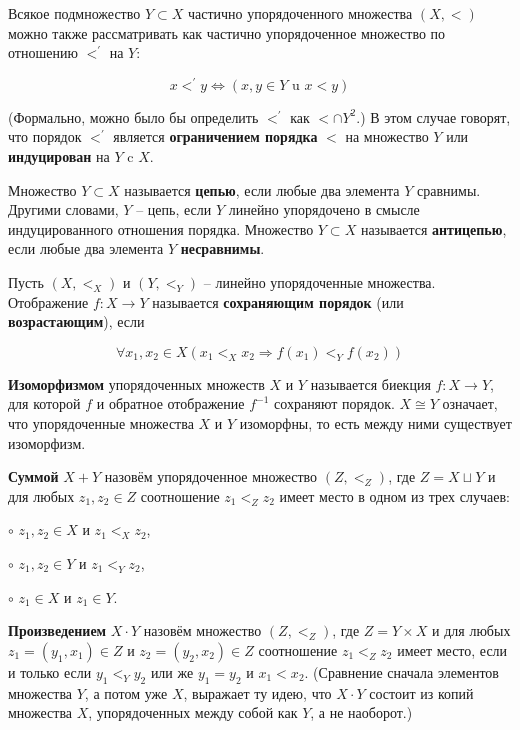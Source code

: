\begin{definition}
	Всякое подмножество $Y \subset X$ частично упорядоченного множества $(X, <)$ можно также рассматривать как
	частично упорядоченное множество по отношению $<^\prime$ на $Y$:

	$$
	x<^{\prime} y \Longleftrightarrow(x, y \in Y \text { u } x<y)
	$$

	(Формально, можно было бы определить $<^\prime$ как $< \cap Y^2$.) В этом случае говорят, что порядок
	$<^\prime$ является \textbf{ограничением порядка} $<$ на множество $Y$ или \textbf{индуцирован} на $Y$ c $X$.

	Множество $Y \subset X$ называется \textbf{цепью}, если любые два элемента $Y$ сравнимы. Другими словами, $Y$
	-- цепь, если $Y$ линейно упорядочено в смысле индуцированного отношения порядка. Множество $Y \subset X$
	называется \textbf{антицепью}, если любые два элемента $Y$ \textbf{несравнимы}.
\end{definition}

\begin{definition}
	Пусть $(X, <_X)$ и $(Y, <_Y)$ -- линейно упорядоченные множества. Отображение $f : X \rightarrow Y$ называется
	\textbf{сохраняющим порядок} (или \textbf{возрастающим}), если

	$$
	\forall x_{1}, x_{2} \in X\left(x_{1}<_{X} x_{2} \Rightarrow f\left(x_{1}\right)<_{Y} f\left(x_{2}\right)\right)
	$$

	\textbf{Изоморфизмом} упорядоченных множеств $X$ и $Y$ называется биекция $f : X \rightarrow Y$, для которой
	$f$ и обратное отображение $f^{-1}$ сохраняют порядок. $X \cong Y$ означает, что упорядоченные множества $X$ и
	$Y$ изоморфны, то есть между ними существует изоморфизм.
\end{definition}

\begin{definition}
	\textbf{Суммой} $X+Y$ назовём упорядоченное множество $(Z, <_Z)$, где $Z =
	X \sqcup Y$ и для любых $z_1, z_2 \in Z$ соотношение $z_1 <_Z z_2$ имеет место в одном
	из трех случаев:

	$\circ$ $z_1, z_2 \in X$ и $z_1 <_X z_2$,

	$\circ$ $z_1, z_2 \in Y$ и $z_1 <_Y z_2$,

	$\circ$ $z_1 \in X$ и $z_1 \in Y$.

	\textbf{Произведением} $X \cdot Y$ назовём множество $(Z, <_Z)$, где $Z = Y \times X$ и для любых $z_1 = (y_1,
	x_1) \in Z$ и $z_2 = (y_2, x_2) \in Z$ соотношение $z_1 <_Z z_2$ имеет место, если и только если $y_1 <_Y y_2$
	или же $y_1 = y_2$ и $x_1 < x_2$. (Сравнение сначала элементов множества $Y$, а потом уже $X$, выражает ту
	идею, что $X \cdot Y$ состоит из копий множества $X$, упорядоченных между собой как $Y$, а не наоборот.)
\end{definition}

